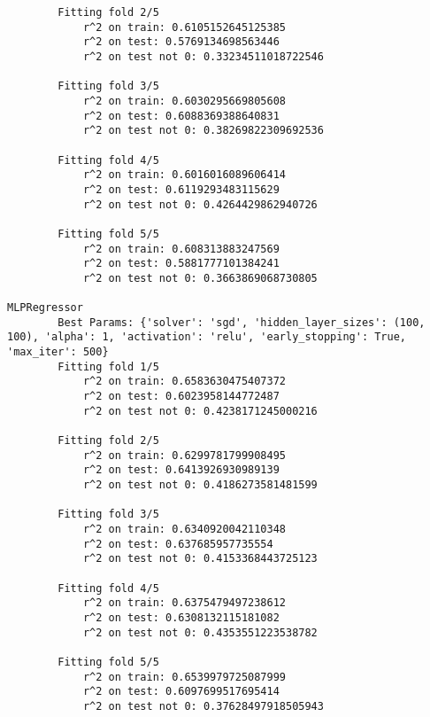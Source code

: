 \begin{verbatim}
		Fitting fold 2/5
			r^2 on train: 0.6105152645125385
			r^2 on test: 0.5769134698563446
			r^2 on test not 0: 0.33234511018722546

		Fitting fold 3/5
			r^2 on train: 0.6030295669805608
			r^2 on test: 0.6088369388640831
			r^2 on test not 0: 0.38269822309692536

		Fitting fold 4/5
			r^2 on train: 0.6016016089606414
			r^2 on test: 0.6119293483115629
			r^2 on test not 0: 0.4264429862940726

		Fitting fold 5/5
			r^2 on train: 0.608313883247569
			r^2 on test: 0.5881777101384241
			r^2 on test not 0: 0.3663869068730805

MLPRegressor
		Best Params: {'solver': 'sgd', 'hidden_layer_sizes': (100, 100), 'alpha': 1, 'activation': 'relu', 'early_stopping': True, 'max_iter': 500}
		Fitting fold 1/5
			r^2 on train: 0.6583630475407372
			r^2 on test: 0.6023958144772487
			r^2 on test not 0: 0.4238171245000216

		Fitting fold 2/5
			r^2 on train: 0.6299781799908495
			r^2 on test: 0.6413926930989139
			r^2 on test not 0: 0.4186273581481599

		Fitting fold 3/5
			r^2 on train: 0.6340920042110348
			r^2 on test: 0.637685957735554
			r^2 on test not 0: 0.4153368443725123

		Fitting fold 4/5
			r^2 on train: 0.6375479497238612
			r^2 on test: 0.6308132115181082
			r^2 on test not 0: 0.4353551223538782

		Fitting fold 5/5
			r^2 on train: 0.6539979725087999
			r^2 on test: 0.6097699517695414
			r^2 on test not 0: 0.37628497918505943
\end{verbatim}

